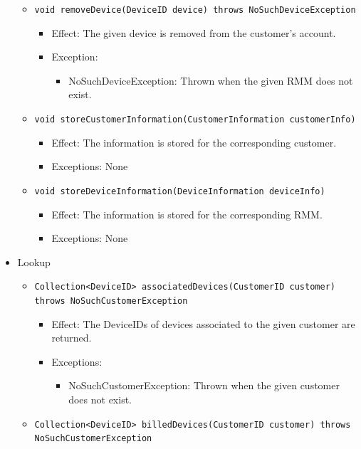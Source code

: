 \documentclass[a4paper,10pt]{article}
\begin{document}
\begin{itemize}
\begin{itemize}
        \item \texttt{void removeDevice(DeviceID device) throws NoSuchDeviceException}
        \begin{itemize}
        	\item Effect: The given device is removed from the customer's account.
            \item Exception:
           	\begin{itemize}
                \item NoSuchDeviceException: Thrown when the given RMM does not exist.
            \end{itemize}
        \end{itemize}
    	\item \texttt{void storeCustomerInformation(CustomerInformation customerInfo)}
        	\begin{itemize}
            	\item Effect: The information is stored for the corresponding customer.
                \item Exceptions: None
            \end{itemize}
        \item \texttt{void storeDeviceInformation(DeviceInformation deviceInfo)}
        	\begin{itemize}
            	\item Effect: The information is stored for the corresponding RMM.
                \item Exceptions: None
            \end{itemize}
    \end{itemize}
    \item Lookup
    \begin{itemize}
    	\item \texttt{Collection<DeviceID> associatedDevices(CustomerID customer) throws NoSuchCustomerException}
        \begin{itemize}
            \item Effect: The DeviceIDs of devices  associated to the given customer are returned.
            \item Exceptions:
            \begin{itemize}
                \item NoSuchCustomerException: Thrown when the given customer does not exist.
            \end{itemize}
        \end{itemize}
   		\item \texttt{Collection<DeviceID> billedDevices(CustomerID customer) throws NoSuchCustomerException}

\end{itemize}
\end{itemize}
\end{document}
